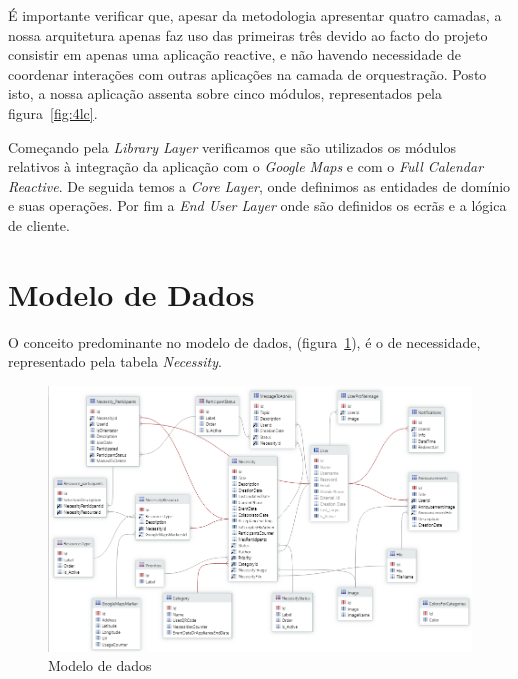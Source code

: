 É importante verificar que, apesar da metodologia apresentar quatro camadas, 
a nossa arquitetura apenas faz uso das primeiras três devido ao facto do projeto consistir em apenas uma aplicação reactive, 
e não havendo necessidade de coordenar interações com outras aplicações na camada de orquestração. 
Posto isto, a nossa aplicação assenta sobre cinco módulos, representados pela figura~\ref{fig:4lc}.

Começando pela \textit{Library Layer} verificamos que são utilizados os módulos relativos à integração da aplicação 
com o \textit{Google Maps} e com o \textit{Full Calendar Reactive}. De seguida temos a \textit{ Core Layer}, 
onde definimos as entidades de domínio e suas operações. Por fim a \textit{ End User Layer} onde são definidos 
os ecrãs e a lógica de cliente. 

\section{Modelo de Dados}\label{subsec:ModeloDados}

O conceito predominante no modelo de dados, (figura~\ref{fig:modeloDados}), é o de necessidade, representado pela tabela \textit{Necessity}.

\begin{figure}[H]
  \centering 
  \includegraphics[scale=0.4]{figures/DataModel.png}
  \caption{Modelo de dados}\label{fig:modeloDados}
\end{figure}

